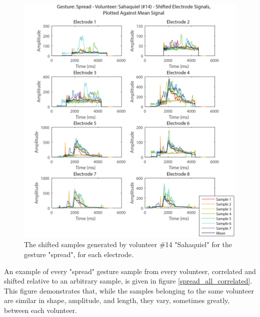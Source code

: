 \documentclass[journal]{IEEEtran}
\begin{document}
    \begin{figure}[p]
    \centering
    \includegraphics[width=1\columnwidth]{EMG/Spread_Min_Sahaquiel_Shifted}
    \caption{The shifted samples generated by volunteer \#14 "Sahaquiel" for the gesture "spread", for each electrode.}
    \label{Spread_Min_Sahaquiel_Shifted}
    \end{figure}
    
    

An example of every "spread" gesture sample from every volunteer, correlated and shifted relative to an arbitrary sample, is given in figure \ref{spread_all_correlated}. This figure demonstrates that, while the samples belonging to the same volunteer are similar in shape, amplitude, and length, they vary, sometimes greatly, between each volunteer.
    
\end{document}
